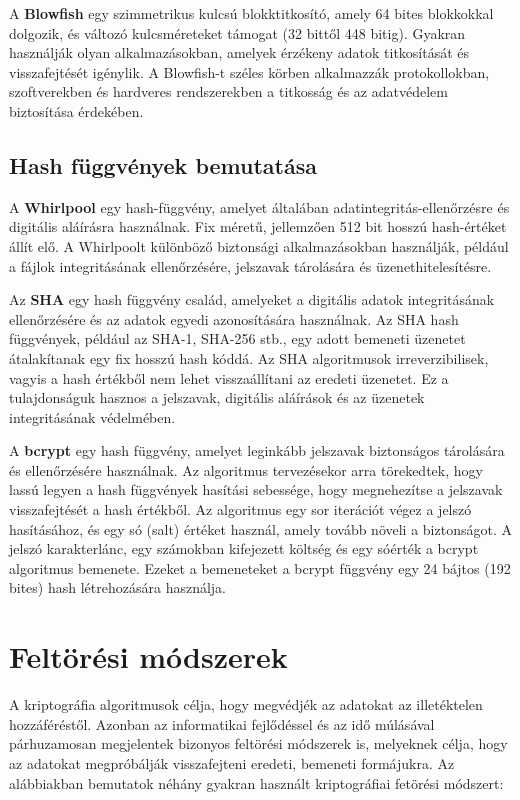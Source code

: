 A \textbf{Blowfish} egy szimmetrikus kulcsú blokktitkosító, amely 64 bites blokkokkal dolgozik, és változó kulcsméreteket támogat (32 bittől 448 bitig). Gyakran használják olyan alkalmazásokban, amelyek érzékeny adatok titkosítását és visszafejtését igénylik. A Blowfish-t széles körben alkalmazzák protokollokban, szoftverekben és hardveres rendszerekben a titkosság és az adatvédelem biztosítása érdekében. \cite{Blowfish}


\subsection {Hash függvények bemutatása}
A \textbf{Whirlpool} egy hash-függvény, amelyet általában adatintegritás-ellenőrzésre és digitális aláírásra használnak. Fix méretű, jellemzően 512 bit hosszú hash-értéket állít elő. A Whirlpoolt különböző biztonsági alkalmazásokban használják, például a fájlok integritásának ellenőrzésére, jelszavak tárolására és üzenethitelesítésre. \cite{Whirlpool}

Az \textbf{SHA} egy hash függvény család, amelyeket a digitális adatok integritásának ellenőrzésére és az adatok egyedi azonosítására használnak. Az SHA hash függvények, például az SHA-1, SHA-256 stb., egy adott bemeneti üzenetet átalakítanak egy fix hosszú hash kóddá. Az SHA algoritmusok irreverzibilisek, vagyis a hash értékből nem lehet visszaállítani az eredeti üzenetet. Ez a tulajdonságuk hasznos a jelszavak, digitális aláírások és az üzenetek integritásának védelmében.

A \textbf{bcrypt} egy hash függvény, amelyet leginkább jelszavak biztonságos tárolására és ellenőrzésére használnak. Az algoritmus tervezésekor arra törekedtek, hogy lassú legyen a hash függvények hasítási sebessége, hogy megnehezítse a jelszavak visszafejtését a hash értékből. Az algoritmus egy sor iterációt végez a jelszó hasításához, és egy só (salt) értéket használ, amely tovább növeli a biztonságot. A jelszó karakterlánc, egy számokban kifejezett költség és egy sóérték a bcrypt algoritmus bemenete. Ezeket a bemeneteket a bcrypt függvény egy 24 bájtos (192 bites) hash létrehozására használja. \cite{bcrypt}

\section{Feltörési módszerek}
A kriptográfia algoritmusok célja, hogy megvédjék az adatokat az illetéktelen hozzáféréstől. Azonban az informatikai fejlődéssel és az idő múlásával párhuzamosan megjelentek bizonyos feltörési módszerek is, melyeknek célja, hogy az adatokat megpróbálják visszafejteni eredeti, bemeneti formájukra. Az alábbiakban bemutatok néhány gyakran használt kriptográfiai fetörési módszert:

